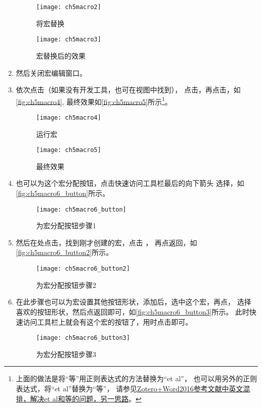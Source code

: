 \documentclass[cn,11pt,chinese]{elegantbook}
\begin{document}
\begin{enumerate}
			\begin{figure}[htbp]
				\centering
				\texttt{[image: ch5macro2]}
				\caption{将宏替换}
				\label{fig:ch5macro2}
			\end{figure}
			\begin{figure}[htbp]
				\centering
				\texttt{[image: ch5macro3]}
				\caption{宏替换后的效果}
				\label{fig:ch5macro3}
			\end{figure}
		\item 然后关闭宏编辑窗口。
		\item 依次点击（如果没有开发工具，也可在视图中找到），
		点击，再点击，如\autoref{fig:ch5macro4},
		最终效果如\autoref{fig:ch5macro5}所示\footnote{
			上面的做法是将“等”用正则表达式的方法替换为“et al”，
						也可以用另外的正则表达式，将“et al”替换为“等”，
						请参见\href{https://zhuanlan.zhihu.com/p/60029219}
						{Zotero+Word2016参考文献中英文混排，解决et al和等的问题，另一思路}。
		}。
			\begin{figure}[htbp]
				\centering
				\texttt{[image: ch5macro4]}
				\caption{运行宏}
				\label{fig:ch5macro4}
			\end{figure}
			\begin{figure}[htbp]
				\centering
				\texttt{[image: ch5macro5]}
				\caption{最终效果}
				\label{fig:ch5macro5}
			\end{figure}
		\item 也可以为这个宏分配按钮，点击快速访问工具栏最后的向下箭头
		选择，如\autoref{fig:ch5macro6_button}所示。	
				\begin{figure}[htbp]
					\centering
					\texttt{[image: ch5macro6\_button]}
					\caption{为宏分配按钮步骤1}
					\label{fig:ch5macro6_button}
				\end{figure}
		\item 然后在处点击，找到刚才创建的宏，点击
		，
		再点返回，如\autoref{fig:ch5macro6_button2}所示。		
				\begin{figure}[htbp]
					\centering
					\texttt{[image: ch5macro6\_button2]}
					\caption{为宏分配按钮步骤2}
					\label{fig:ch5macro6_button2}
				\end{figure}
		\item 在此步骤也可以为宏设置其他按钮形状，添加后，选中这个宏，再点，
		选择喜欢的按钮形状，然后点返回即可，如\autoref{fig:ch5macro6_button3}所示。
		此时快速访问工具栏上就会有这个宏的按钮了，用时点击即可。	
			\begin{figure}[htbp]
				\centering
				\texttt{[image: ch5macro6\_button3]}
				\caption{为宏分配按钮步骤3}
				\label{fig:ch5macro6_button3}
			\end{figure}
		\end{enumerate}
			
\end{document}
